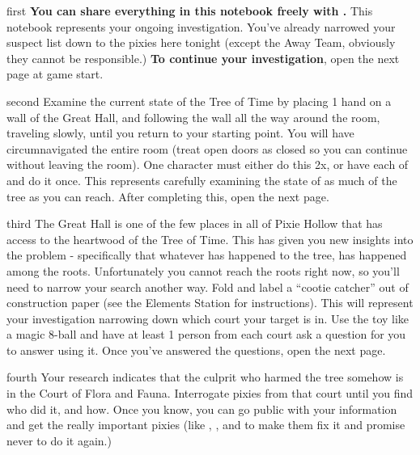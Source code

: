 \documentclass[notebook]{PP} %
\begin{document}
\startnotebook{\nTree{}}

\begin{page}{first}
\textbf{You can share everything in this notebook freely with \cSHelp{}.} 
This notebook represents your ongoing investigation. You've already narrowed your suspect list down to the pixies here tonight (except the Away Team, obviously they cannot be responsible.) \textbf{To continue your investigation}, open the next page at game start.
\end{page}

\begin{page}{second}
Examine the current state of the Tree of Time by placing 1 hand on a wall of the Great Hall, and following the wall all the way around the room, traveling slowly, until you return to your starting point. You will have circumnavigated the entire room (treat open doors as closed so you can continue without leaving the room). One character must either do this 2x, or have each of \cSHelp{} and \cMTree{} do it once. This represents carefully examining the state of as much of the tree as you can reach. After completing this, open the next page.
\end{page}

\begin{page}{third}
The Great Hall is one of the few places in all of Pixie Hollow that has access to the heartwood of the Tree of Time. This has given you new insights into the problem - specifically that whatever has happened to the tree, has happened among the roots. Unfortunately you cannot reach the roots right now, so you'll need to narrow your search another way. Fold and label a ``cootie catcher'' out of construction paper (see the Elements Station for instructions). This will represent your investigation narrowing down which court your target is in. Use the toy like a magic 8-ball and have at least 1 person from each court ask a question for you to answer using it. Once you've answered the questions, open the next page.
\end{page}

\begin{page}{fourth}
Your research indicates that the culprit who harmed the tree somehow is in the Court of Flora and Fauna. Interrogate pixies from that court until you find who did it, and how. Once you know, you can go public with your information and get the really important pixies (like \cMHead{}, \cSAdvisor{}, and \cSHead{} to make them fix it and promise never to do it again.)
\end{page}

\endnotebook
\end{document}
